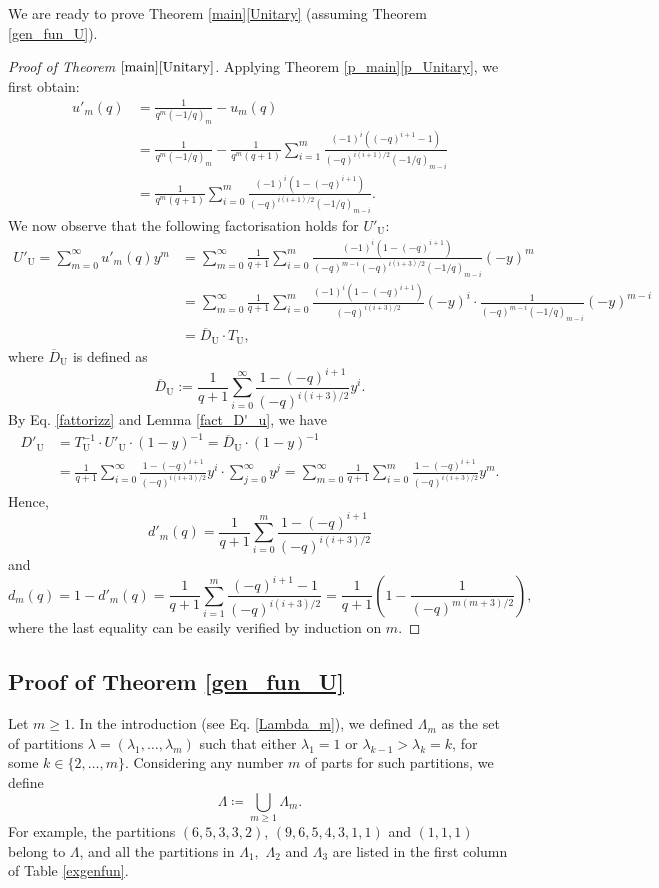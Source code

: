 \documentclass[a4paper, 12pt, oneside]{amsart}
\theoremstyle{definition}
\DeclareMathOperator{\U}{U}
\begin{document}
We are ready to prove Theorem \ref{main}\eqref{Unitary} (assuming Theorem \ref{gen_fun_U}).
\begin{proof}[Proof of Theorem  $\ref{main}\eqref{Unitary}$]
Applying Theorem \ref{p_main}\eqref{p_Unitary}, we first obtain:
\begin{align*}
u'_m(q)& =\frac{1}{q^m(-1/q)_m}-u_m(q) \\
& =\frac{1}{q^m(-1/q)_m}-\frac{1}{q^m(q+1)}\sum_{i=1}^m\frac{(-1)^{i}((-q)^{i+1}-1)}{(-q)^{i(i+1)/2}(-1/q)_{m-i}}\\
& = \frac{1}{q^m(q+1)}\sum_{i=0}^{m}\frac{(-1)^{i}(1-(-q)^{i+1})}{(-q)^{i(i+1)/2}(-1/q)_{m-i}}.
\end{align*}
We now observe that the following factorisation holds for $U'_{\U}$:
\begin{align}
    \nonumber
U'_{\U}=\sum_{m=0}^{\infty}u'_m(q)y^m&=\sum_{m=0}^{\infty}\frac{1}{q+1}\sum_{i=0}^{m}\frac{(-1)^i(1-(-q)^{i+1})}{(-q)^{m-i}(-q)^{i(i+3)/2}(-1/q)_{m-i}}(-y)^m\\
\nonumber
    &=\sum_{m=0}^{\infty}\frac{1}{q+1}\sum_{i=0}^{m}\frac{(-1)^i(1-(-q)^{i+1})}{(-q)^{i(i+3)/2}}(-y)^i\cdot\frac{1}{(-q)^{m-i}(-1/q)_{m-i}}(-y)^{m-i}\\
    \label{fattorizz}
    &=\overline{D}_{\U}\cdot T_{ \U},
\end{align}
where $\overline{D}_{\U}$ is defined as
$$\overline{D}_{\U}:=\frac{1}{q+1}\sum_{i=0}^{\infty}\frac{1-(-q)^{i+1}}{(-q)^{i(i+3)/2}}y^i.$$
By Eq. \eqref{fattorizz} and Lemma \ref{fact_D'_u}, we have 
\begin{align*}
D'_{\U}&=T^{-1}_{\U}\cdot U'_{\U} \cdot (1-y)^{-1}= \overline{D}_{\U} \cdot (1-y)^{-1} \\
&=\frac{1}{q+1}\sum_{i=0}^{\infty}\frac{1-(-q)^{i+1}}{(-q)^{i(i+3)/2}}y^i\cdot \sum_{j=0}^{\infty}y^j=\sum_{m=0}^{\infty}\frac{1}{q+1}\sum_{i=0}^{m}\frac{1-(-q)^{i+1}}{(-q)^{i(i+3)/2}}y^m.
\end{align*}
Hence,
$$d'_m(q)=\frac{1}{q+1}\sum_{i=0}^{m}\frac{1-(-q)^{i+1}}{(-q)^{i(i+3)/2}}$$
and
$$d_m(q)=1-d'_m(q)=\frac{1}{q+1}\sum_{i=1}^{m}\frac{(-q)^{i+1}-1}{(-q)^{i(i+3)/2}}=\frac{1}{q+1}\left(1-\frac{1}{(-q)^{m(m+3)/2}}\right),$$
where the last equality can be easily verified by induction on $m$.
\end{proof}

\subsection{Proof of Theorem \ref{gen_fun_U}}
\label{Sec_gen_fun_U}
Let $m\ge1$. In the introduction (see Eq. \eqref{Lambda_m}), we defined $\Lambda_m$ as the set of partitions 
$\lambda=(\lambda_1,\dots,\lambda_m)$ 
 such that either $\lambda_1=1$ or $\lambda_{k-1}>\lambda_k=k$, for some $k \in \{2,\dots,m\}$.
 Considering any number $m$ of parts for such partitions, we define
 \begin{equation*}
\Lambda\coloneqq \bigcup_{m\ge1}\Lambda_m.
 \end{equation*}
 For example, the partitions $(6,5,3,3,2)$, $(9,6,5,4,3,1,1)$ and $(1,1,1)$ belong to $\Lambda$, and all the partitions in $\Lambda_1,$ $\Lambda_2$ and $\Lambda_3$ are listed in the first column of Table \ref{exgenfun}.
\end{document}
